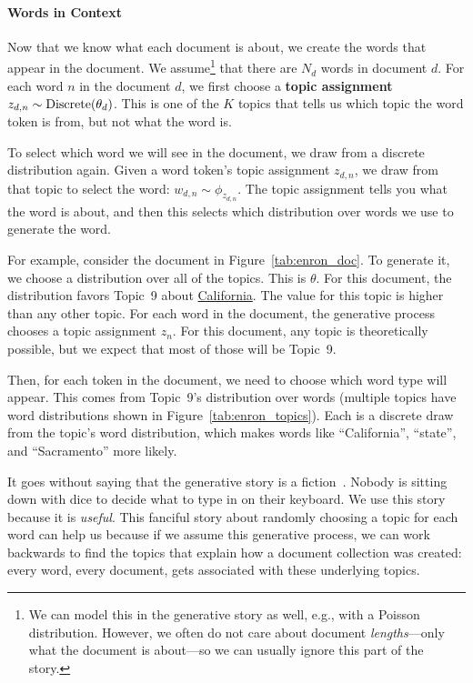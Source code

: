 \paragraph{Words in Context}

Now that we know what each document is about, we create the
words that appear in the document.  We assume\footnote{We can model
  this in the generative story as well, e.g., with a Poisson distribution.
  However, we often do not care about document \emph{lengths}---only what the
  document is about---so we can usually ignore this part of the story.} that
there are $N_d$ words in document $d$.  For each word $n$ in the
document $d$, we first choose a {\bf topic assignment} $z_{d,n} \sim
\mbox{Discrete}( \theta_d)$.  This is one of the $K$ topics that tells us which topic the
word token is from, but not what the word is.

To select which word we will see in the document, we draw from a discrete
distribution again.  Given a word token's topic assignment $z_{d,n}$, we draw from that
topic to select the word: $w_{d,n} \sim \phi_{z_{d,n}}$.  The topic assignment
tells you what the word is about, and then this selects which distribution over
words we use to generate the word.  %

For example, consider the document in Figure~\ref{tab:enron_doc}.  To
generate it, we choose a distribution over all of the topics.  This is
$\theta$.  For this document, the distribution favors Topic~9 about
\underline{California}.  The value for this topic is higher than any other topic.  For
each word in the document, the generative process chooses a topic
assignment $z_n$.  For this document, any topic is theoretically possible, but we expect that most of those will be Topic~9.

Then, for each token in the document, we need to choose which word type will appear.  This
comes from Topic~9's distribution over words (multiple topics have
word distributions shown in Figure~\ref{tab:enron_topics}).  Each is a
discrete draw from the topic's word distribution, which makes words
like ``California'', ``state'', and ``Sacramento'' more likely.

It goes without saying that the generative story is a fiction~\citep{box-87}.
Nobody is sitting down with dice to decide what to type in on their keyboard.
We use this story because it is \emph{useful}.  This fanciful story about randomly
choosing a topic for each word can help us because if we assume this generative
process, we can work backwards to find the topics that explain how a document
collection was created: every word, every document, gets associated with these
underlying topics.

